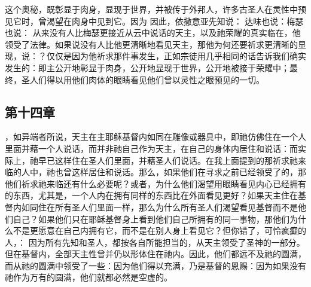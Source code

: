 这个奥秘，既彰显于肉身，显现于世界，并被传于外邦人，许多古圣人在灵性中预见它时，曾渴望在肉身中见到它。因为  因此，依撒意亚先知说：  达味也说：梅瑟也说：  从来没有人比梅瑟更接近从云中说话的天主，以及祂荣耀的真实临在，他领受了法律。如果说没有人比他更清晰地看见天主，那他为何还要祈求更清晰的显现，说：？仅仅是因为他祈求那件事发生，正如宗徒用几乎相同的话告诉我们确实发生的：即主公开地彰显于肉身，公开地显现于世界，公开地被接于荣耀中；最终，圣人们得以用他们肉体的眼睛看见他们曾以灵性之眼预见的一切。\par


\subsection{第十四章}

\par

，如异端者所说，天主在主耶稣基督内如同在雕像或器具中，即祂仿佛住在一个人里面并藉一个人说话，而并非祂自己作为天主，在自己的身体内居住和说话：而实际上，祂早已这样住在圣人们里面，并藉圣人们说话。在我上面提到的那祈求祂来临的人中，祂也曾这样居住和说话。那么，如果他们在寻求之前已经领受了的，那他们祈求祂来临还有什么必要呢？或者，为什么他们渴望用眼睛看见内心已经拥有的东西，尤其是，一个人内在拥有同样的东西比在外面看见更好？如果天主住在基督内如同住在所有圣人们里面一样，那么为什么所有圣人们渴望看见基督而不是他们自己？如果他们只在耶稣基督身上看到他们自己所拥有的同一事物，那他们为什么不是更愿意在自己内拥有它，而不是在别人身上看见它？但你错了，可怜疯癫的人，： 因为所有先知和圣人，都按各自所能担当的，从天主领受了圣神的一部分。但在基督内，全部天主性曾并仍以形体住在祂内。因此，他们都远不及祂的圆满，而从祂的圆满中领受了一些：因为他们得以充满，乃是基督的恩赐：因为如果没有祂作为万有的圆满，他们就都必然是空虚的。\par


